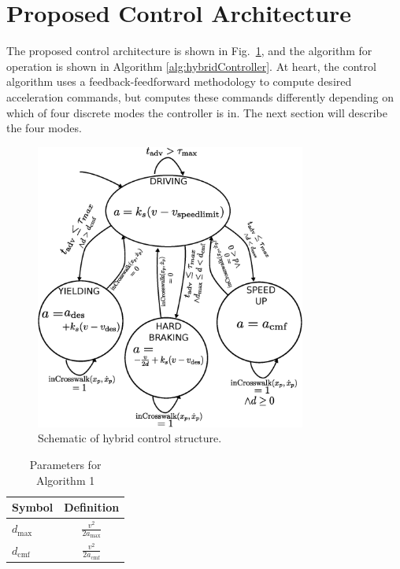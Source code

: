 \documentclass[letterpaper, 10 pt, conference]{ieeeconf}  %
\begin{document}
\section{Proposed Control Architecture}

The proposed control architecture is shown in Fig.~\ref{fig:hybridController}, and the algorithm for operation is shown in Algorithm \ref{alg:hybridController}. At heart, the control algorithm uses a feedback-feedforward methodology to compute desired acceleration commands, but computes these commands differently depending on which of four discrete modes the controller is in. The next section will describe the four modes. 

\begin{figure}
\centering
\includegraphics[width=3.5in]{figures/stateDiagram2.eps}
\caption{Schematic of hybrid control structure.}
\label{fig:hybridController}
\end{figure}

\begin{table}[h]
\begin{center}
\caption{Parameters for Algorithm 1}\label{tb:params}
\begin{tabular}{lc}
Symbol & Definition \\\hline\hline
$d_\mathrm{max}$ & $\frac{v^2}{2a_\mathrm{max}}$ \\
$d_\mathrm{cmf}$ & $\frac{v^2}{2a_\mathrm{cmf}}$ \\\hline
\end{tabular}
\end{center}
\end{table}
\end{document}
